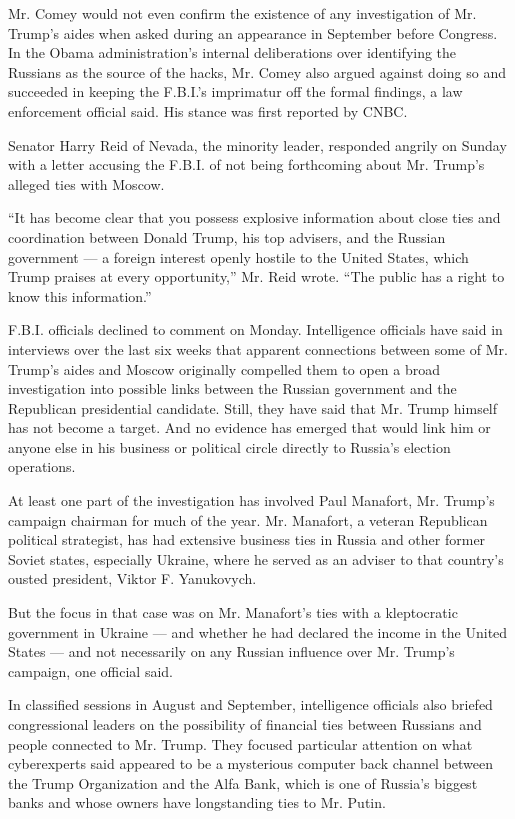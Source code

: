 Mr. Comey would not even confirm the existence of any investigation of
Mr. Trump's aides when asked during an appearance in September before
Congress. In the Obama administration's internal deliberations over
identifying the Russians as the source of the hacks, Mr. Comey also
argued against doing so and succeeded in keeping the F.B.I.'s imprimatur
off the formal findings, a law enforcement official said. His stance was
first reported by CNBC.

Senator Harry Reid of Nevada, the minority leader, responded angrily on
Sunday with a letter accusing the F.B.I. of not being forthcoming about
Mr. Trump's alleged ties with Moscow.

``It has become clear that you possess explosive information about close
ties and coordination between Donald Trump, his top advisers, and the
Russian government --- a foreign interest openly hostile to the United
States, which Trump praises at every opportunity,'' Mr. Reid wrote.
``The public has a right to know this information.''

F.B.I. officials declined to comment on Monday. Intelligence officials
have said in interviews over the last six weeks that apparent
connections between some of Mr. Trump's aides and Moscow originally
compelled them to open a broad investigation into possible links between
the Russian government and the Republican presidential candidate. Still,
they have said that Mr. Trump himself has not become a target. And no
evidence has emerged that would link him or anyone else in his business
or political circle directly to Russia's election operations.

At least one part of the investigation has involved Paul Manafort, Mr.
Trump's campaign chairman for much of the year. Mr. Manafort, a veteran
Republican political strategist, has had extensive business ties in
Russia and other former Soviet states, especially Ukraine, where he
served as an adviser to that country's ousted president, Viktor F.
Yanukovych.

But the focus in that case was on Mr. Manafort's ties with a
kleptocratic government in Ukraine --- and whether he had declared the
income in the United States --- and not necessarily on any Russian
influence over Mr. Trump's campaign, one official said.

In classified sessions in August and September, intelligence officials
also briefed congressional leaders on the possibility of financial ties
between Russians and people connected to Mr. Trump. They focused
particular attention on what cyberexperts said appeared to be a
mysterious computer back channel between the Trump Organization and the
Alfa Bank, which is one of Russia's biggest banks and whose owners have
longstanding ties to Mr. Putin.

